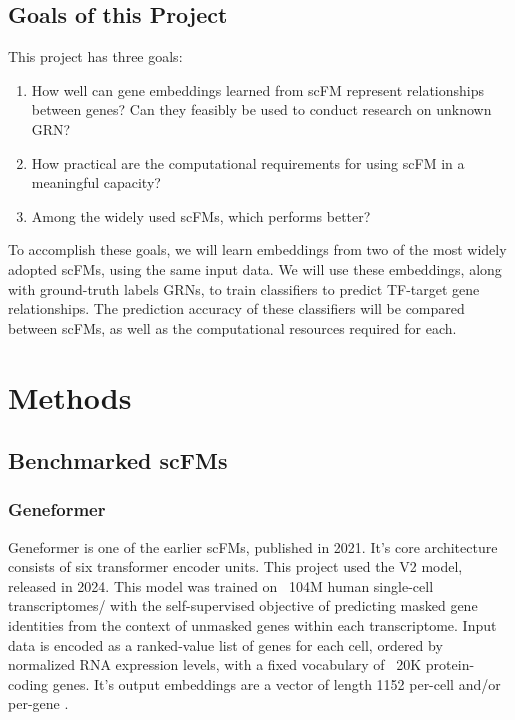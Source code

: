 \documentclass[12pt, letterpaper]{report}
\let\oldsection\section
\renewcommand{\section}{\clearpage\oldsection}
\begin{document}


\section{Goals of this Project}

This project has three goals:
\begin{enumerate}
    \item How well can gene embeddings learned from scFM represent relationships between genes? Can they feasibly be used to conduct research on unknown GRN?
    \item How practical are the computational requirements for using scFM in a meaningful capacity?
    \item Among the widely used scFMs, which performs better?
\end{enumerate}

To accomplish these goals, we will learn embeddings from two of the most widely adopted scFMs, using the same input data. We will use these embeddings, along with ground-truth labels GRNs, to train classifiers to predict TF-target gene relationships. The prediction accuracy of these classifiers will be compared between scFMs, as well as the computational resources required for each.


\chapter{Methods}
\label{ch:methods}


\section{Benchmarked scFMs}

\subsection{Geneformer}

Geneformer is one of the earlier scFMs, published in 2021. It's core architecture consists of six transformer encoder units. This project used the V2 model, released in 2024. This model was trained on ~104M human single-cell transcriptomes/ with the self-supervised objective of predicting masked gene identities from the context of unmasked genes within each transcriptome. Input data is encoded as a ranked-value list of genes for each cell, ordered by normalized RNA expression levels, with a fixed vocabulary of ~20K protein-coding genes. It's output embeddings are a vector of length 1152 per-cell and/or per-gene \cite{geneformer}.
\end{document}
